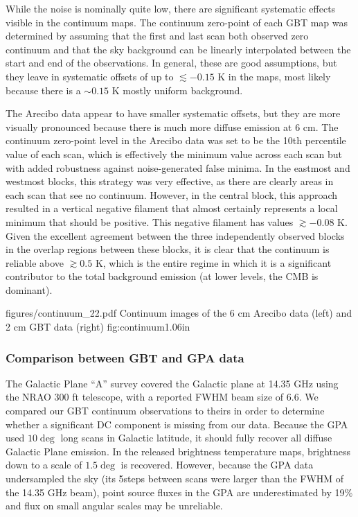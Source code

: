 While the noise is nominally quite low, there are significant systematic
effects visible in the continuum maps.  The continuum zero-point of each GBT
map was determined by assuming that the first and last scan both observed zero
continuum and that the sky background can be linearly interpolated between the
start and end of the observations.  In general, these are good assumptions, but
they leave in systematic offsets of up to $\lesssim-0.15$ K in the maps, most
likely because there is a $\sim0.15$ K mostly uniform background.

The Arecibo data appear to have smaller systematic offsets, but they are more
visually pronounced because there is much more diffuse emission
at 6 cm.  The continuum zero-point level in the Arecibo data was set to be the
10th percentile value of each scan, which is effectively the minimum value
across each scan but with added robustness against noise-generated false
minima.  In the eastmost and westmost blocks, this strategy was very effective,
as there are clearly areas in each scan that see no continuum.  However, in the
central block, this approach resulted in a vertical negative filament that
almost certainly represents a local minimum that should be positive.  This
negative filament has values $\gtrsim-0.08$ K.  Given the excellent agreement
between the three independently observed blocks in the overlap regions between
these blocks, it is clear that the continuum is reliable above $\gtrsim0.5$ K,
which is the entire regime in which it is a significant contributor to the
total background emission (at lower levels, the CMB is dominant).

            {figures/continuum_22.pdf}
{Continuum images of the 6 cm Arecibo data (left) and 2 cm GBT data (right)}
{fig:continuum}{1.0}{6in}


\subsubsection{Comparison between GBT and GPA data}
\label{sec:gpacompare}
The Galactic Plane ``A'' survey \citep{Langston2000a} covered the Galactic
plane at 14.35 GHz using the NRAO 300 ft telescope, with a reported FWHM beam
size of 6.6\arcmin.  We compared our GBT continuum observations to theirs in
order to determine whether a significant DC component is missing from our data.
Because the GPA used $10\deg$ long scans in Galactic latitude, it should fully
recover all diffuse Galactic Plane emission.  In the released brightness temperature
maps, brightness down to a scale of $1.5\deg$ is recovered.  However, because
the GPA data undersampled the sky (its 5\arcmin steps between scans were larger
than the FWHM of the 14.35 GHz beam), point source fluxes in the GPA are
underestimated by 19\% and flux on small angular scales may be unreliable.

